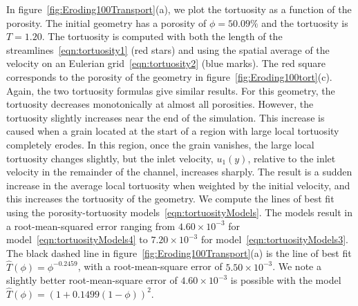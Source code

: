 \documentclass{jfm}
\begin{document}
In figure~\ref{fig:Eroding100Transport}(a), we plot the tortuosity as a
function of the porosity.  The initial geometry has a porosity of $\phi
= 50.09\%$ and the tortuosity is $T = 1.20$.  The tortuosity is computed
with both the length of the streamlines~\eqref{eqn:tortuosity1} (red
stars) and using the spatial average of the velocity on an Eulerian
grid~\eqref{eqn:tortuosity2} (blue marks).  The red square corresponds
to the porosity of the geometry in figure~\ref{fig:Eroding100tort}(c).
Again, the two tortuosity formulas give similar results. For this
geometry, the tortuosity decreases monotonically at almost all
porosities. However, the tortuosity slightly increases near the end of
the simulation. This increase is caused when a grain located at the
start of a region with large local tortuosity completely erodes.  In
this region, once the grain vanishes, the large local tortuosity changes
slightly, but the inlet velocity, $u_1(y)$, relative to the inlet
velocity in the remainder of the channel, increases sharply. The result
is a sudden increase in the average local tortuosity when weighted by
the initial velocity, and this increases the tortuosity of the geometry.
We compute the lines of best fit using the porosity-tortuosity
models~\eqref{eqn:tortuosityModels}.  The models result in a
root-mean-squared error ranging from $4.60 \times 10^{-3}$ for
model~\eqref{eqn:tortuosityModels4} to $7.20 \times 10^{-3}$ for
model~\eqref{eqn:tortuosityModels3}. The black dashed line in
figure~\ref{fig:Eroding100Transport}(a) is the line of best fit
$\widehat{T}(\phi) = \phi^{-0.2459}$, with a root-mean-square error of
$5.50 \times 10^{-3}$.  We note a slightly better root-mean-square error
of $4.60 \times 10^{-3}$ is possible with the model $\widehat{T}(\phi) =
\left(1 + 0.1499(1-\phi)\right)^2$.
\end{document}
